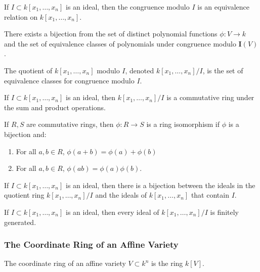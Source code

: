 \documentclass[../main.tex]{subfiles}
\begin{document}
\begin{theorem}
If $I\subset k[x_1,\hdots ,x_n]$ is an ideal, then the congruence modulo $I$ is an equivalence relation on $k[x_1,\hdots ,x_n]$.
\end{theorem}

\begin{theorem}
There exists a bijection from the set of distinct polynomial functions $\phi:V\rightarrow k$ and the set of equivalence classes of polynomials under congruence modulo $\textbf{I}(V)$.
\end{theorem}

\begin{definition}
The quotient of $k[x_1,\hdots ,x_n]$ modulo $I$, denoted $k[x_1,\hdots ,x_n]/I$, is the set of equivalence classes for congruence modulo $I$.
\end{definition}

\begin{theorem}
If $I\subset k[x_1,\hdots ,x_n]$ is an ideal, then $k[x_1,\hdots ,x_n]/I$ is a commutative ring under the sum and product operations.
\end{theorem}

\begin{definition}
If $R,S$ are commutative rings, then $\phi:R\rightarrow S$ is a ring isomorphism if $\phi$ is a bijection and:
\begin{enumerate}
\item For all $a,b\in R$, $\phi(a+b) = \phi(a)+\phi(b)$
\item For all $a,b\in R$, $\phi(ab) = \phi(a)\phi(b)$.
\end{enumerate}
\end{definition}

\begin{theorem}
If $I\subset k[x_1,\hdots ,x_n]$ is an ideal, then there is a bijection between the ideals in the quotient ring $k[x_1,\hdots ,x_n]/I$ and the ideals of $k[x_1,\hdots ,x_n]$ that contain $I$.
\end{theorem}

\begin{theorem}
If $I\subset k[x_1,\hdots ,x_n]$ is an ideal, then every ideal of $k[x_1,\hdots ,x_n]/I$ is finitely generated.
\end{theorem}
%
\subsubsection{The Coordinate Ring of an Affine Variety}
%
\begin{definition}
The coordinate ring of an affine variety $V\subset k^n$ is the ring $k[V]$.
\end{definition}
\end{document}
